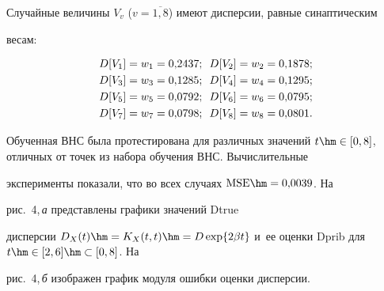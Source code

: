   Случайные величины $V_v$ ($v=\overline{1,8}$) имеют дисперсии, равные синаптическим 


весам: 





\vspace*{-2pt}





\noindent


\begin{gather*}


D[V_1] =w_1=0{,}2437;\enskip  D[V_2] = w_2= 0{,}1878;\\ 


D[V_3]=w_3= 0{,}1285;\enskip D[V_4]= w_4= 0{,}1295;\\ 


D[V_5]=w_5= 0{,}0792;\enskip D[V_6]= w_6= 0{,}0795;\\ 


D[V_7]= w_7 = 0{,}0798;\enskip D[V_8]= w_8= 0{,}0801.


\end{gather*}





\vspace*{-2pt}


  


  Обученная ВНС была протестирована для различных значений $t\hm\in 


[0,8]$, отличных от точек из набора обучения ВНС. Вычислительные 


эксперименты показали, что во всех случаях $\mathrm{MSE}\hm=0{,}0039$. На 


рис.~4,\,\textit{а} представлены графики значений Dtrue 


дисперсии $D_X(t)\hm= K_X(t,t) \hm= D\exp \{2\beta t\}$ и~ее оценки Dprib для $t\hm\in [2,6]\hm\subset [0,8]$. На 


рис.~4,\,\textit{б} изображен график модуля ошибки оценки дисперсии. 





\setcounter{figure}{6}


